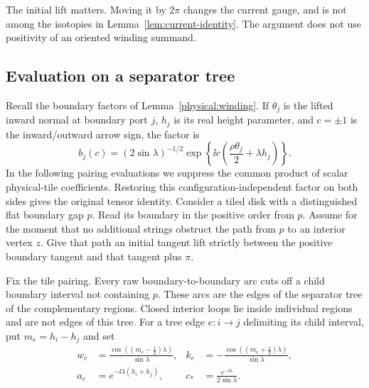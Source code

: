 The initial lift matters.  Moving it by $2\pi$ changes the current gauge,
and is not among the isotopies in
Lemma~\ref{lem:current-identity}.  The argument does not use positivity of
an oriented winding summand.

\subsection{Evaluation on a separator tree}
\label{calc:tree}

Recall the boundary factors of Lemma~\ref{physical:winding}.  If
$\theta_j$ is the lifted inward normal at boundary port $j$, $h_j$ is
its real height parameter, and $c=\pm1$ is the inward/outward arrow sign,
the factor is
\begin{equation}
 b_j(c)=(2\sin\lambda)^{-1/2}
       \exp\!\left\{\ii c\left(\frac{\rho\theta_j}{2}
                                     +\lambda h_j\right)\right\}.
 \label{calc:boundary-factor}
\end{equation}
In the following pairing evaluations we suppress the common product of
scalar physical-tile coefficients.  Restoring this configuration-independent
factor on both sides gives the original tensor identity.
Consider a tiled disk with a distinguished flat boundary gap $p$.
Read its boundary in the positive order from $p$.  Assume for the moment
that no additional strings obstruct the path from $p$ to an interior
vertex $z$.  Give that path an initial tangent lift strictly between
the positive boundary tangent and that tangent plus $\pi$.

Fix the tile pairing.  Every raw boundary-to-boundary arc cuts off a
child boundary interval not containing $p$.  These arcs are the edges
of the separator tree of the complementary regions.  Closed interior
loops lie inside individual regions and are not edges of this tree.
For a tree edge $e:i\to j$ delimiting its child interval, put
$m_e=h_i-h_j$ and set
\begin{equation}
 \begin{aligned}
 w_e&=\frac{\cos((m_e-\tfrac12)\lambda)}{\sin\lambda},&
 k_e&=-\frac{\cos((m_e+\tfrac12)\lambda)}{\sin\lambda},\\
 a_e&=e^{-\ii\lambda(h_i+h_j)},&
 c_*&=\frac{e^{-\ii\lambda}}{2\sin\lambda}.
 \end{aligned}
 \label{calc:tree-coefficients}
\end{equation}

